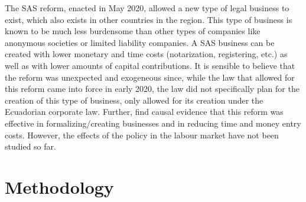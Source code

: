 \documentclass[11pt,a4paper]{article}\usepackage[]{graphicx}\usepackage[]{xcolor}
\begin{document}
The SAS reform, enacted in May 2020, allowed a new type of legal business to exist, which also exists in other countries in the region. This type of business is known to be much less burdensome than other types of companies like anonymous societies or limited liability companies. A SAS business can be created with lower monetary and time costs (notarization, registering, etc.) as well as with lower amounts of capital contributions. It is sensible to believe that the reform was unexpected and exogeneous since, while the law that allowed for this reform came into force in early 2020, the law did not specifically plan for the creation of this type of business, only allowed for its creation under the Ecuadorian corporate law. Further, \textcite{CaminoMogro.2022} find causal evidence that this reform was effective in formalizing/creating businesses and in reducing time and money entry costs. However, the effects of the policy in the labour market have not been studied so far. 

\section{Methodology}
\end{document}
